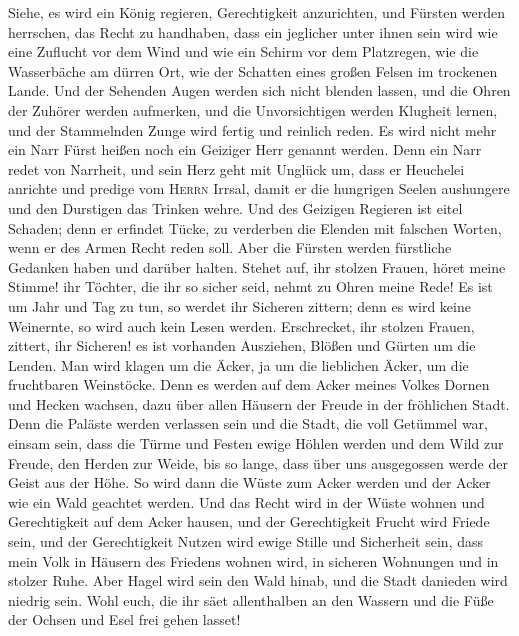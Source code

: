  Siehe, es wird ein König regieren, Gerechtigkeit
anzurichten, und Fürsten werden herrschen, das Recht zu handhaben,
 dass ein jeglicher unter ihnen sein wird wie eine
Zuflucht vor dem Wind und wie ein Schirm vor dem Platzregen, wie die
Wasserbäche am dürren Ort, wie der Schatten eines großen Felsen im
trockenen Lande.  Und der Sehenden Augen werden sich nicht
blenden lassen, und die Ohren der Zuhörer werden aufmerken,
 und die Unvorsichtigen werden Klugheit lernen, und der
Stammelnden Zunge wird fertig und reinlich reden.  Es wird
nicht mehr ein Narr Fürst heißen noch ein Geiziger Herr genannt werden.
 Denn ein Narr redet von Narrheit, und sein Herz geht mit
Unglück um, dass er Heuchelei anrichte und predige vom \textsc{Herrn}
Irrsal, damit er die hungrigen Seelen aushungere und den Durstigen das
Trinken wehre.  Und des Geizigen Regieren ist eitel
Schaden; denn er erfindet Tücke, zu verderben die Elenden mit falschen
Worten, wenn er des Armen Recht reden soll.  Aber die
Fürsten werden fürstliche Gedanken haben und darüber halten.
 Stehet auf, ihr stolzen Frauen, höret meine Stimme! ihr
Töchter, die ihr so sicher seid, nehmt zu Ohren meine Rede!
 Es ist um Jahr und Tag zu tun, so werdet ihr Sicheren
zittern; denn es wird keine Weinernte, so wird auch kein Lesen werden.
 Erschrecket, ihr stolzen Frauen, zittert, ihr Sicheren!
es ist vorhanden Ausziehen, Blößen und Gürten um die Lenden.
 Man wird klagen um die Äcker, ja um die lieblichen
Äcker, um die fruchtbaren Weinstöcke.  Denn es werden auf
dem Acker meines Volkes Dornen und Hecken wachsen, dazu über allen
Häusern der Freude in der fröhlichen Stadt.  Denn die
Paläste werden verlassen sein und die Stadt, die voll Getümmel war,
einsam sein, dass die Türme und Festen ewige Höhlen werden und dem Wild
zur Freude, den Herden zur Weide,  bis so lange, dass
über uns ausgegossen werde der Geist aus der Höhe. So wird dann die
Wüste zum Acker werden und der Acker wie ein Wald geachtet werden.
 Und das Recht wird in der Wüste wohnen und Gerechtigkeit
auf dem Acker hausen,  und der Gerechtigkeit Frucht wird
Friede sein, und der Gerechtigkeit Nutzen wird ewige Stille und
Sicherheit sein,  dass mein Volk in Häusern des Friedens
wohnen wird, in sicheren Wohnungen und in stolzer Ruhe. 
Aber Hagel wird sein den Wald hinab, und die Stadt danieden wird niedrig
sein.  Wohl euch, die ihr säet allenthalben an den
Wassern und die Füße der Ochsen und Esel frei gehen lasset!

